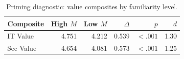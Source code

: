 \begin{table}[ht]
\centering
\caption{Priming diagnostic: value composites by familiarity level.}
\label{tab:priming}
\small
\begin{tabular}{lrrrrr}
\toprule
Composite & High $M$ & Low $M$ & $\Delta$ & $p$ & $d$ \\
\midrule
IT Value & 4.751 & 4.212 & 0.539 & $<.001$ & 1.30 \\
Sec Value & 4.654 & 4.081 & 0.573 & $<.001$ & 1.25 \\
\bottomrule
\end{tabular}
\end{table}

